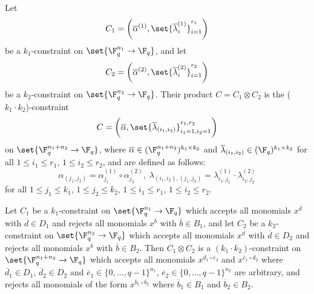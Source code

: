\begin{definition}
Let $$C_1=\bigg(\overline \alpha^{(1)}, \set{\overline \lambda^{(1)}_i}_{i=1}^{r_1}\bigg)$$ be a $k_1$-constraint
on $\set{\F_q^{n_1} \to \F_q}$,
and let  $$C_2=\bigg(\overline \alpha^{(2)}, \set{\overline \lambda^{(2)}_i}_{i=1}^{r_2}\bigg)$$ be a $k_2$-constraint on $\set{\F_q^{n_2} \to \F_q}$.
Their product  $C = C_1 \otimes C_2$ is the ($k_1 \cdot k_2$)-constraint  $$C=\bigg(\overline \alpha, \set{\overline \lambda_{(i_1,i_2)}}_{i_1=1,i_2=1}^{r_1,r_2}\bigg)$$
on $\set{\F_q^{n_1+n_2} \to \F_q}$, where
$\overline \alpha \in (\F_{q}^{n_1+n_2})^{k_1 \times k_2}$ and $\overline \lambda_{(i_1,i_2)} \in (\F_q)^{k_1 \times k_2}$ for all $1 \leq i_1 \leq r_1$, $1 \leq i_2 \leq r_2$,  and are defined as follows:
\[\alpha_{(j_1,j_2)} =  \alpha^{(1)}_{j_1} \circ  \alpha^{(2)}_{j_2}  , \; \lambda_{(i_1,i_2),(j_1,j_2)} = \lambda^{(1)}_{i_1,j_1}\cdot \lambda^{(2)}_{i_2,j_2} \]
for all $1 \leq j_1 \leq k_1$, $1 \leq j_2\leq k_2$, $1 \leq i_1 \leq r_1$, $1 \leq i_2 \leq r_2$.
\end{definition}

\begin{proposition}\label{pro:product}
Let $C_1$ be a $k_1$-constraint on $\set{\F_{q}^{n_1}\to \F_q}$ which accepts all monomials $x^{\overline d}$ with  $\overline d \in D_1$ and rejects all monomials $x^{\overline b}$ with $\overline b \in B_1$, and
let $C_2$ be a $k_2$-constraint on $\set{\F_{q}^{n_2}\to \F_q}$ which accepts all monomials $x^{\overline d}$ with  $\overline d \in D_2$ and rejects all monomials
$x^{\overline b}$ with  $\overline b \in B_2$.
Then $C_1 \otimes C_2$  is a $(k_1\cdot k_2)$-constraint on $\set{\F_q^{n_1+n_2} \to \F_q}$ which accepts
all monomials $x^{\overline d_1 \circ \overline e_2}$ and $x^{\overline e_1 \circ \overline d_2}$ where
$\overline d_1 \in D_1$, $\overline d_2 \in D_2$ and $\overline e_1 \in \{0,\ldots,q-1\}^{n_1}$, $\overline e_2 \in \{0,\ldots,q-1\}^{n_2}$ are arbitrary,
and rejects all monomials of the form
$x^{\overline b_1 \circ \overline b_2}$ where $\overline b_1 \in B_1$ and $\overline b_2 \in B_2$.
\end{proposition}

